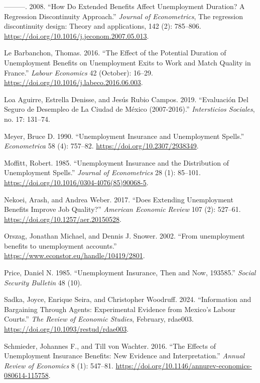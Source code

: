 \documentclass[
  4pt,
]{report}
\newlength{\cslhangindent}
\newenvironment{CSLReferences}[2] %
 {\begin{list}{}{%
  \setlength{\itemindent}{0pt}
  \setlength{\leftmargin}{0pt}
  \setlength{\parsep}{0pt}
  \ifodd #1
   \setlength{\leftmargin}{\cslhangindent}
   \setlength{\itemindent}{-1\cslhangindent}
  \fi
  \setlength{\itemsep}{#2\baselineskip}}}
 {\end{list}}
\begin{document}
\begin{CSLReferences}{1}{0}
---------. 2008. {``How Do Extended Benefits Affect Unemployment
Duration? A Regression Discontinuity Approach.''} \emph{Journal of
Econometrics}, The regression discontinuity design: Theory and
applications, 142 (2): 785--806.
\url{https://doi.org/10.1016/j.jeconom.2007.05.013}.

Le Barbanchon, Thomas. 2016. {``The Effect of the Potential Duration of
Unemployment Benefits on Unemployment Exits to Work and Match Quality in
France.''} \emph{Labour Economics} 42 (October): 16--29.
\url{https://doi.org/10.1016/j.labeco.2016.06.003}.

Loa Aguirre, Estrella Denisse, and Jesús Rubio Campos. 2019.
{``Evaluación Del Seguro de Desempleo de La Ciudad de México
(2007-2016).''} \emph{Intersticios Sociales}, no. 17: 131--74.

Meyer, Bruce D. 1990. {``Unemployment Insurance and Unemployment
Spells.''} \emph{Econometrica} 58 (4): 757--82.
\url{https://doi.org/10.2307/2938349}.

Moffitt, Robert. 1985. {``Unemployment Insurance and the Distribution of
Unemployment Spells.''} \emph{Journal of Econometrics} 28 (1): 85--101.
\url{https://doi.org/10.1016/0304-4076(85)90068-5}.

Nekoei, Arash, and Andrea Weber. 2017. {``Does Extending Unemployment
Benefits Improve Job Quality?''} \emph{American Economic Review} 107
(2): 527--61. \url{https://doi.org/10.1257/aer.20150528}.

Orszag, Jonathan Michael, and Dennis J. Snower. 2002. {``From
unemployment benefits to unemployment accounts.''}
\url{https://www.econstor.eu/handle/10419/2801}.

Price, Daniel N. 1985. {``Unemployment Insurance, Then and Now,
1935{\textendash}85.''} \emph{Social Security Bulletin} 48 (10).

Sadka, Joyce, Enrique Seira, and Christopher Woodruff. 2024.
{``Information and Bargaining Through Agents: Experimental Evidence from
Mexico{'}s Labour Courts.''} \emph{The Review of Economic Studies},
February, rdae003. \url{https://doi.org/10.1093/restud/rdae003}.

Schmieder, Johannes F., and Till von Wachter. 2016. {``The Effects of
Unemployment Insurance Benefits: New Evidence and Interpretation.''}
\emph{Annual Review of Economics} 8 (1): 547--81.
\url{https://doi.org/10.1146/annurev-economics-080614-115758}.


\end{CSLReferences}
\end{document}
